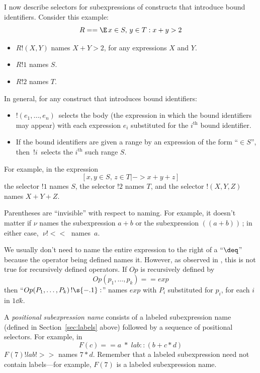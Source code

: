 \documentclass[fleqn,leqno]{article}
\newcommand{\bangcolon}{\mbox{$!\s{-.1}:$}}
\begin{document}
I now describe selectors for subexpressions of constructs that
introduce bound identifiers.  Consider this example:
 \[ R == \E\, x \in S, \, y \in T : x + y  > 2 \]
\begin{itemize}
\item $R!(X, Y)$ names $X + Y  > 2$, for any expressions $X$ and $Y$.
\item $R!1$ names $S$.
\item $R!2$ names $T$.
\end{itemize}
In general, for any construct that introduces bound identifiers:
\begin{itemize}
\item $!(e_{1}, \ldots , e_{n})\,$ selects the body (the expression
in which the bound identifiers may appear) with each expression $e_{i}$
substituted for the $i^{\mathrm{th}}$ bound identifier.

\item If the bound identifiers are given a range by an expression
of the form ``$\in S$'', then $\,!i\,$ selects the $i^{\mathrm{th}}$ 
such range $S$.
\end{itemize}
For example, in the expression
 \[ [x, y \in S,\, z \in T |-> x+y+z]\]
the selector $!1$ names $S$, the selector $!2$ names $T$, and
the selector $!(X,Y,Z)$ names $X+Y+Z$.

\bigskip

Parentheses are ``invisible'' with respect to naming.  For example, it
doesn't matter if $\nu$ names the subexpression $a+b$ or the
subexpression $((a + b))$\,; in either case, $\;\nu!<<\;$ names~$a$.

\bigskip

We usually don't need to name the entire expression to the right
of a ``$\deq$'' because the operator being defined names it.
However, as observed in 
 , 
 this is not
true for recursively defined operators.  If $Op$ is recursively
defined by
 \[ Op(p_{1}, \ldots, p_{k}) == exp\]
then ``$Op(P_{1}, \ldots, P_{k})\,\bangcolon$'' names $exp$ with
$P_{i}$ substituted for $p_{i}$, for each $i$ in $1\dd k$.

\bigskip

A \emph{positional subexpression name} consists of a labeled
subexpression name (defined in Section~\ref{sec:labels} above)
followed by a sequence of positional selectors.  For example, in
 \[F(c) == a \; * \; lab:: (b+c*d) \]
$F(7)!lab!>>$ names $7*d$.  Remember that a labeled subexpression need
not contain labels---for example, $F(7)$ is a labeled subexpression
name.
\end{document}
